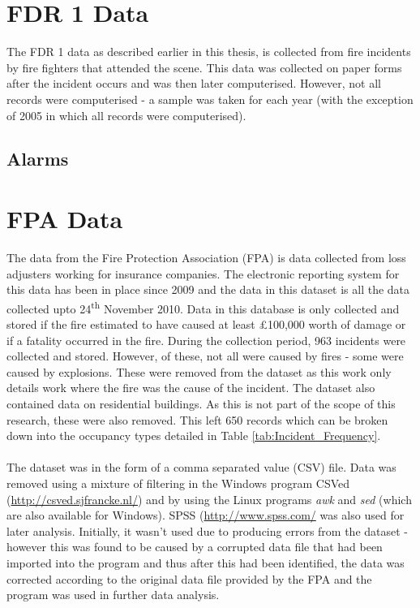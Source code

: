 \documentclass[a4paper,oneside]{book}
\begin{document}
\section{FDR 1 Data}
The FDR 1 data as described earlier in this thesis, is collected from fire incidents by fire fighters that attended the scene. This data was collected on paper forms after the incident occurs and was then later computerised. However, not all records were computerised - a sample was taken for each year (with the exception of 2005 in which all records were computerised).

\subsection{Alarms}

\section{FPA Data}
The data from the Fire Protection Association (FPA) is data collected from loss adjusters working for insurance companies. The electronic reporting system for this data has been in place since 2009 and the data in this dataset is all the data collected upto 24\textsuperscript{th} November 2010. Data in this database is only collected and stored if the fire estimated to have caused at least \pounds 100,000 worth of damage or if a fatality occurred in the fire. During the collection period, 963 incidents were collected and stored. However, of these, not all were caused by fires - some were caused by explosions. These were removed from the dataset as this work only details work where the fire was the cause of the incident. The dataset also contained data on residential buildings. As this is not part of the scope of this research, these were also removed. This left 650 records which can be broken down into the occupancy types detailed in Table \ref{tab:Incident_Frequency}.
\\
\\
The dataset was in the form of a comma separated value (CSV) file. Data was removed using a mixture of filtering in the Windows program CSVed (\url{http://csved.sjfrancke.nl/}) and by using the Linux programs \textit{awk} and \textit{sed} (which are also available for Windows). SPSS (\url{http://www.spss.com/} was also used for later analysis. Initially, it wasn't used due to producing errors from the dataset - however this was found to be caused by a corrupted data file that had been imported into the program and thus after this had been identified, the data was corrected according to the original data file provided by the FPA and the program was used in further data analysis.
\end{document}
